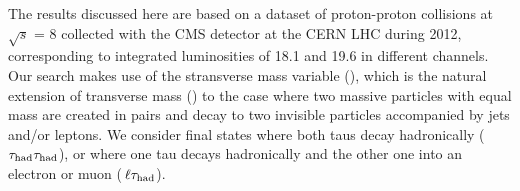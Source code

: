 

The results discussed here are based on a dataset of proton-proton 
collisions at $\sqrt{s}$ = 8 \TeV
collected with the CMS detector at the CERN LHC during 2012, corresponding to integrated
luminosities of 18.1 and 19.6 \invfb in different channels. 
Our search makes use of the stransverse mass variable (\mttwo), 
which is the natural extension of transverse mass (\mt) to the case 
where two massive particles with equal mass are created in pairs and decay 
to two invisible particles accompanied by jets and/or leptons.  We consider final states where
both taus decay hadronically ($\tau_{\rm had} \tau_{\rm had}$), or where one tau decays hadronically and the
other one into an electron or muon ($\,\ell\tau_{\rm had}$).

